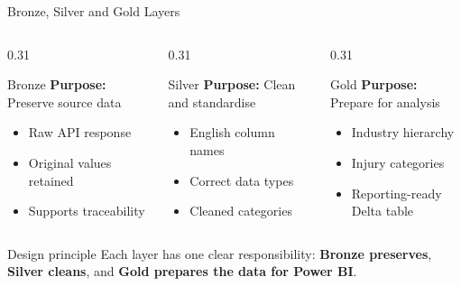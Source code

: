 \documentclass[aspectratio=169]{beamer}
\begin{document}
\begin{frame}{Bronze, Silver and Gold Layers} \small \begin{columns}[T,onlytextwidth] \begin{column}{0.31\textwidth} \begin{block}{Bronze} \textbf{Purpose:} Preserve source data \vspace{0.2cm} \begin{itemize} \setlength{\itemsep}{0.15cm} \item Raw API response \item Original values retained \item Supports traceability \end{itemize} \end{block} \end{column} \begin{column}{0.31\textwidth} \begin{block}{Silver} \textbf{Purpose:} Clean and standardise \vspace{0.2cm} \begin{itemize} \setlength{\itemsep}{0.15cm} \item English column names \item Correct data types \item Cleaned categories \end{itemize} \end{block} \end{column} \begin{column}{0.31\textwidth} \begin{block}{Gold} \textbf{Purpose:} Prepare for analysis \vspace{0.2cm} \begin{itemize} \setlength{\itemsep}{0.15cm} \item Industry hierarchy \item Injury categories \item Reporting-ready Delta table \end{itemize} \end{block} \end{column} \end{columns} \vspace{0.45cm} \begin{alertblock}{Design principle} Each layer has one clear responsibility: \textbf{Bronze preserves}, \textbf{Silver cleans}, and \textbf{Gold prepares the data for Power BI}. \end{alertblock} \end{frame}
\end{document}
